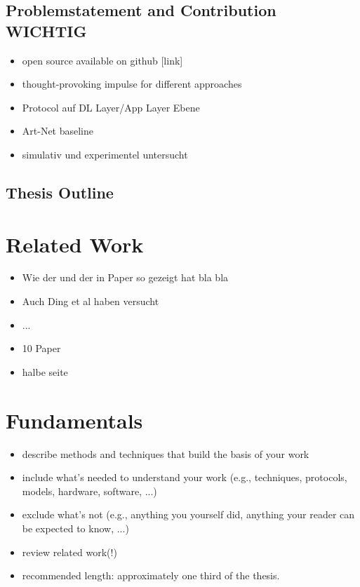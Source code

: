 \documentclass[]{ccs-thesis}
\begin{document}
\section*{Problemstatement and Contribution WICHTIG}
\begin{itemize}
\item open source available on github [link]
\item thought-provoking impulse for different approaches
\item Protocol auf DL Layer/App Layer Ebene
\item Art-Net baseline
\item simulativ und experimentel untersucht
\end{itemize}

\section*{Thesis Outline}

\chapter{Related Work}
\begin{itemize}
	\item Wie der und der in Paper so gezeigt hat bla bla
	\item Auch Ding et al haben versucht
	\item ...
	\item 10 Paper
	\item halbe seite
\end{itemize}

\chapter{Fundamentals}
\label{sec:fundamentals}

\begin{itemize}

\item describe methods and techniques that build the basis of your work
\item include what's needed to understand your work (e.g., techniques, protocols, models, hardware, software, ...)
\item exclude what's not (e.g., anything you yourself did, anything your reader can be expected to know, ...)
\item review related work(!)
\item recommended length: approximately one third of the thesis.
\end{itemize}
\end{document}
